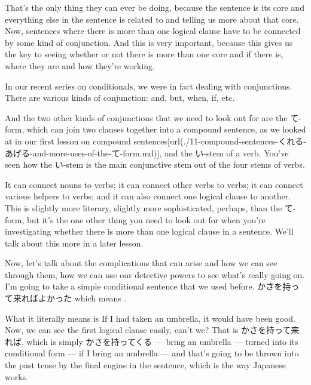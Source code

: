 {}

That's the only thing they can ever be doing, because the sentence is its core and everything else in the sentence is related to and telling us more about that core. Now, sentences where there is more than one logical clause have to be connected by some kind of conjunction. And this is very important, because this gives us the key to seeing whether or not there is more than one core and if there is, where they are and how they're working.

In our recent series on conditionals, we were in fact dealing with conjunctions. There are various kinds of conjunction: and, but, when, if, etc.

{}

And the two other kinds of conjunctions that we need to look out for are the て-form, which can join two clauses together into a compound sentence, as we looked at in our first lesson on compound sentences\goto{{[}11{]}}[url(./11-compound-sentences-くれる-あげる-and-more-uses-of-the-て-form.md)], and the い-stem of a verb. You've seen how the い-stem is the main conjunctive stem out of the four stems of verbs.

{}

It can connect nouns to verbs; it can connect other verbs to verbs; it can connect various helpers to verbs; and it can also connect one logical clause to another. This is slightly more literary, slightly more sophisticated, perhaps, than the て-form, but it's the one other thing you need to look out for when you're investigating whether there is more than one logical clause in a sentence. We'll talk about this more in a later lesson.

Now, let's talk about the complications that can arise and how we can see through them, how we can use our detective powers to see what's really going on. I'm going to take a simple conditional sentence that we used before. かさを持って来ればよかった which means .

What it literally means is If I had taken an umbrella, it would have been good. Now, we can see the first logical clause easily, can't we? That is かさを持って来れば, which is simply かさを持ってくる --- bring an umbrella --- turned into its conditional form --- if I bring an umbrella --- and that's going to be thrown into the past tense by the final engine in the sentence, which is the way Japanese works.


